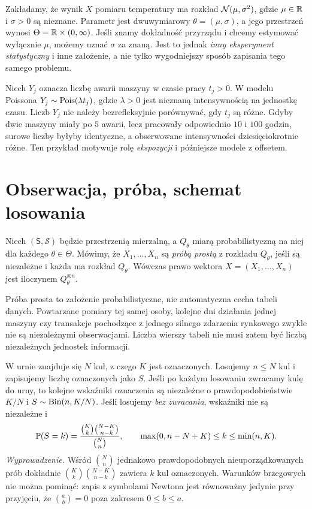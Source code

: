 \begin{przyklad}
Zakładamy, że wynik $X$ pomiaru temperatury ma rozkład $\mathcal N(\mu,\sigma^2)$, gdzie $\mu\in\mathbb R$ i $\sigma>0$ są nieznane. Parametr jest dwuwymiarowy $\theta=(\mu,\sigma)$, a jego przestrzeń wynosi $\Theta=\mathbb R\times(0,\infty)$. Jeśli znamy dokładność przyrządu i chcemy estymować wyłącznie $\mu$, możemy uznać $\sigma$ za znaną. Jest to jednak \emph{inny eksperyment statystyczny} i inne założenie, a nie tylko wygodniejszy sposób zapisania tego samego problemu.
\end{przyklad}

\begin{przyklad}\label{ex:exposure}
Niech $Y_j$ oznacza liczbę awarii maszyny w czasie pracy $t_j>0$. W modelu Poissona $Y_j\sim\operatorname{Pois}(\lambda t_j)$, gdzie $\lambda>0$ jest nieznaną intensywnością na jednostkę czasu. Liczb $Y_j$ nie należy bezrefleksyjnie porównywać, gdy $t_j$ są różne. Gdyby dwie maszyny miały po $5$ awarii, lecz pracowały odpowiednio $10$ i $100$ godzin, surowe liczby byłyby identyczne, a obserwowane intensywności dziesięciokrotnie różne. Ten przykład motywuje rolę \emph{ekspozycji} i późniejsze modele z offsetem.
\end{przyklad}

\section{Obserwacja, próba, schemat losowania}
\begin{definicja}\label{def:sample}
Niech $(\mathsf S,\mathcal S)$ będzie przestrzenią mierzalną, a $Q_\theta$ miarą probabilistyczną na niej dla każdego $\theta\in\Theta$. Mówimy, że $X_1,\ldots,X_n$ są \emph{próbą prostą} z rozkładu $Q_\theta$, jeśli są niezależne i każda ma rozkład $Q_\theta$. Wówczas prawo wektora $X=(X_1,\ldots,X_n)$ jest iloczynem $Q_\theta^{\otimes n}$.
\end{definicja}

Próba prosta to założenie probabilistyczne, nie automatyczna cecha tabeli danych. Powtarzane pomiary tej samej osoby, kolejne dni działania jednej maszyny czy transakcje pochodzące z jednego silnego zdarzenia rynkowego zwykle nie są niezależnymi obserwacjami. Liczba wierszy tabeli nie musi zatem być liczbą niezależnych jednostek informacji.

\begin{przyklad}\label{ex:replacement}
W urnie znajduje się $N$ kul, z czego $K$ jest oznaczonych. Losujemy $n\le N$ kul i zapisujemy liczbę oznaczonych jako $S$. Jeśli po każdym losowaniu zwracamy kulę do urny, to kolejne wskaźniki oznaczenia są niezależne o prawdopodobieństwie $K/N$ i $S\sim\operatorname{Bin}(n,K/N)$. Jeśli losujemy \emph{bez zwracania}, wskaźniki nie są niezależne i
\[
\mathbb P(S=k)=\frac{\binom Kk\binom{N-K}{n-k}}{\binom Nn},\qquad
\max(0,n-N+K)\le k\le\min(n,K).
\]
\emph{Wyprowadzenie.} Wśród $\binom Nn$ jednakowo prawdopodobnych nieuporządkowanych prób dokładnie $\binom Kk\binom{N-K}{n-k}$ zawiera $k$ kul oznaczonych. Warunków brzegowych nie można pominąć: zapis z symbolami Newtona jest równoważny jedynie przy przyjęciu, że $\binom ab=0$ poza zakresem $0\le b\le a$.
\end{przyklad}

